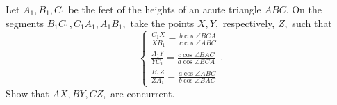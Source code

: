 Let $ A_1,B_1,C_1 $ be the feet of the heights of an acute triangle $ ABC. $ On the segments $ B_1C_1,C_1A_1,A_1B_1, $ take the points $ X,Y, $ respectively, $ Z, $ such that
$$ \left\{\begin{matrix}\frac{C_1X}{XB_1} =\frac{b\cos\angle BCA}{c\cos\angle ABC} \\  \frac{A_1Y}{YC_1} =\frac{c\cos\angle BAC}{a\cos\angle BCA} \\ \frac{B_1Z}{ZA_1} =\frac{a\cos\angle ABC}{b\cos\angle BAC} \end{matrix}\right. . $$Show that $ AX,BY,CZ, $ are concurrent.